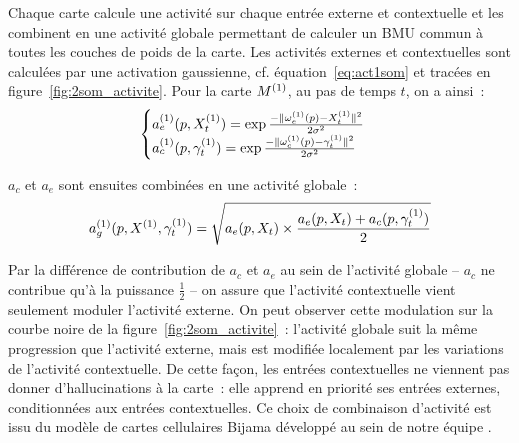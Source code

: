 \documentclass[../main]{subfiles}
\begin{document}
Chaque carte calcule une activité sur chaque entrée externe et contextuelle et les combinent en une activité globale permettant de calculer un BMU commun à toutes les couches de poids de la carte.
Les activités externes et contextuelles sont calculées par une activation gaussienne, cf. équation~\ref{eq:act1som} et tracées en figure~\ref{fig:2som_activite}.
Pour la carte $M^{({1})}$, au pas de temps $t$, on a ainsi~:
\begin{equation}
\label{eq:activite}
\begin{cases}
a_e^{({1})}(p, X_t^{({1})}) = \exp\frac{-\lVert \omega_e^{({1})}(p)-X^{({1})}_t \rVert^2}{2\sigma^2} \\
a_c^{({1})}(p, \gamma^{({1})}_t) = \exp\frac{-\lVert \omega_c^{({1})}(p)-\gamma^{({1})}_t \rVert ^2}{2\sigma^2}\\
\end{cases}
\end{equation}

$a_c$ et $a_e$ sont ensuites combinées en une activité globale~:
\begin{equation}
a_g^{({1})}(p, X^{({1})},\gamma^{({1})}_t) = \sqrt{a_e(p, X_t)\times \frac{a_e(p, X_t) + a_c(p,\gamma^{({1})}_t)}{2}}
\end{equation}

Par la différence de contribution de $a_c$ et $a_e$ au sein de l'activité globale -- $a_c$ ne contribue qu'à la puissance $\frac{1}{2}$ -- on assure que l'activité contextuelle vient seulement moduler l'activité externe.
On peut observer cette modulation sur la courbe noire de la figure~\ref{fig:2som_activite}~: l'activité globale suit la même progression que l'activité externe, mais est modifiée localement par les variations de l'activité contextuelle. 
De cette façon, les entrées contextuelles ne viennent pas donner d'\og hallucinations \fg{} à la carte~: elle apprend en priorité ses entrées externes, conditionnées aux entrées contextuelles. Ce choix de combinaison d'activité est issu du modèle de cartes cellulaires Bijama développé au sein de notre équipe \parencite{menard05,khouzam_2013,baheux_towards_2014}.
\end{document}
